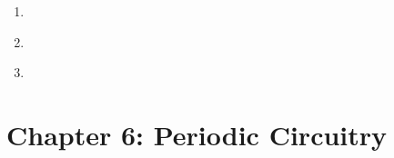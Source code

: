 \begin{multicols}{2}
\begin{itemize}[leftmargin=0em]
\begin{enumerate}[leftmargin=1.5em,label=\bf\color{ocre}(\alph*)]
			\item {} \\
			
			\item {} \\
			
			\item {} \\
		\end{enumerate}
	\end{itemize}
\end{multicols}




\hypertarget{solutions_periodic_circuitry}{}\label{solutions_periodic_circuitry}
\section*{Chapter 6: Periodic Circuitry}
\renewcommand{\chapterfolder}{periodic_circuitry/}


